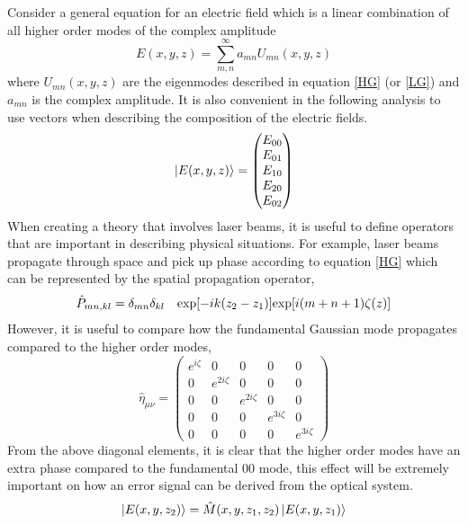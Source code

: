 		Consider a general equation for an electric field which is a linear combination of all higher order modes of the complex amplitude
		\begin{equation}
		E(x,y,z) = \sum\limits_{m,n}^{\infty} a_{mn} U_{mn}(x,y,z)
		\end{equation}
		where $ U_{mn}(x,y,z)$ are the eigenmodes described in equation \ref{HG} (or \ref{LG}) and $a_{mn}$ is the complex amplitude.  It is also convenient in the following analysis to use vectors when describing the composition of the electric fields.
		\begin{equation}\label{EVector}
		\ket{E(x,y,z)} = \begin{pmatrix} E_{00} 
		\\ E_{01}
		\\E_{10}
		\\E_{20}
		\\E_{02}
		\end{pmatrix}
		\end{equation}
		When creating a theory that involves laser beams, it is useful to define operators that are important in describing physical situations.  For example, laser beams propagate through space and pick up phase according to equation \ref{HG} which can be represented by the spatial propagation operator,
		\begin{equation}
		\hat{P}_{mn,kl} = \delta_{mn} \delta_{kl} \quad \text{exp}[-ik(z_2 - z_1)] 
		\\ \text{exp}[i(m+n+1)\zeta(z)]
		\end{equation}
		However, it is useful to compare how the fundamental Gaussian mode propagates compared to the higher order modes,
		\begin{equation} \label{GouyPhaseMatrix}
		\hat{\eta}_{\mu \nu} = 
		\begin{pmatrix}
		e^{i\zeta}	&0			&0			& 0 			& 0
		\\ 0		&e^{2i\zeta}	&0			& 0				& 0
		\\ 0		&0			&e^{2i\zeta}	& 0				& 0
		\\ 0		&0			&0			& e^{3i\zeta}	& 0
		\\ 0		&0			&0			& 0				& e^{3i\zeta}
		\end{pmatrix}
		\end{equation}
		From the above diagonal elements, it is clear that the higher order modes have an extra phase compared to the fundamental 00 mode, this effect will be extremely important on how an error signal can be derived from the optical system.
		\begin{equation}
		\ket{E(x,y,z_2)} = \hat{M}(x,y,z_1,z_2)	\ket{E(x,y,z_1)}
		\end{equation}
